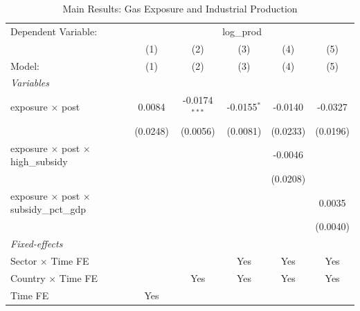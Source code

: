 
\begin{table}[htbp]
   \caption{\label{tab:main} Main Results: Gas Exposure and Industrial Production}
   \centering
   \begin{tabular}{lccccc}
      \tabularnewline \midrule \midrule
      Dependent Variable: & \multicolumn{5}{c}{log\_prod}\\
                                                            & (1)                   & (2)             & (3)                   & (4)                   & (5) \\   
      Model:                                                & (1)                   & (2)             & (3)                   & (4)                   & (5)\\  
      \midrule
      \emph{Variables}\\
      exposure $\times$ post                                & 0.0084                & -0.0174$^{***}$ & -0.0155$^{*}$         & -0.0140               & -0.0327\\   
                                                            & (0.0248)              & (0.0056)        & (0.0081)              & (0.0233)              & (0.0196)\\   
      exposure $\times$ post $\times$ high\_subsidy         &                       &                 &                       & -0.0046               &   \\   
                                                            &                       &                 &                       & (0.0208)              &   \\   
      exposure $\times$ post $\times$ subsidy\_pct\_gdp     &                       &                 &                       &                       & 0.0035\\   
                                                            &                       &                 &                       &                       & (0.0040)\\   
      \midrule
      \emph{Fixed-effects}\\
      Sector $\times$ Time FE                               &                       &                 & Yes                   & Yes                   & Yes\\  
      Country $\times$ Time FE                              &                       & Yes             & Yes                   & Yes                   & Yes\\  
      Time FE                                               & Yes                   &                 &                       &                       & \\  

\end{tabular}
\end{table}
